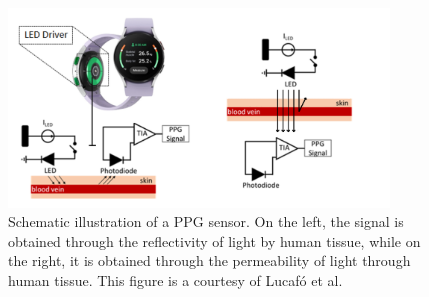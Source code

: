 \begin{figure}[h!]
	\centering
	\includegraphics[width=0.9\textwidth]{img/ppg.png}
	\caption{Schematic illustration of a \gls{PPG} sensor. On the left, the signal is obtained through the reflectivity of light by human tissue, while on the right, it is obtained through the permeability of light through human tissue. This figure is a courtesy of Lucafó et al.~\protect\cite{deep-learning-3}}
	\label{fig:method:ppg}
\end{figure}
